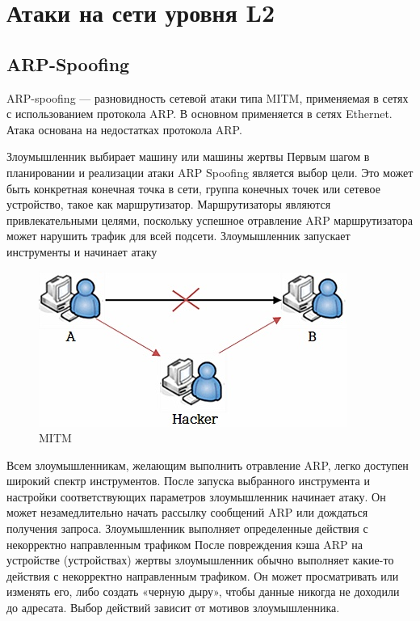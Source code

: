 \documentclass[a4paper, 12pt]{report}
\begin{document}
	\chapter{Атаки на сети уровня L2}
		\section{ARP-Spoofing}
		
		ARP-spoofing \cite{бирюков2022информационная} — разновидность сетевой атаки типа MITM, применяемая в сетях с использованием протокола ARP. В основном применяется в сетях Ethernet. Атака основана на недостатках протокола ARP.
		
		Злоумышленник выбирает машину или машины жертвы
		Первым шагом в планировании и реализации атаки ARP Spoofing является выбор цели. Это может быть конкретная конечная точка в сети, группа конечных точек или сетевое устройство, такое как маршрутизатор. Маршрутизаторы являются привлекательными целями, поскольку успешное отравление ARP маршрутизатора может нарушить трафик для всей подсети.
		Злоумышленник запускает инструменты и начинает атаку
		\begin{figure}[h!]
			\centering
			\includegraphics[scale=0.45]{img/2.jpg}
			\caption{MITM}
			\label{chargets}
		\end{figure}
		Всем злоумышленникам, желающим выполнить отравление ARP, легко доступен широкий спектр инструментов. После запуска выбранного инструмента и настройки соответствующих параметров злоумышленник начинает атаку. Он может незамедлительно начать рассылку сообщений ARP или дождаться получения запроса.
		Злоумышленник выполняет определенные действия с некорректно направленным трафиком
		После повреждения кэша ARP на устройстве (устройствах) жертвы злоумышленник обычно выполняет какие-то действия с некорректно направленным трафиком. Он может просматривать или изменять его, либо создать «черную дыру», чтобы данные никогда не доходили до адресата. Выбор действий зависит от мотивов злоумышленника.
\end{document}
